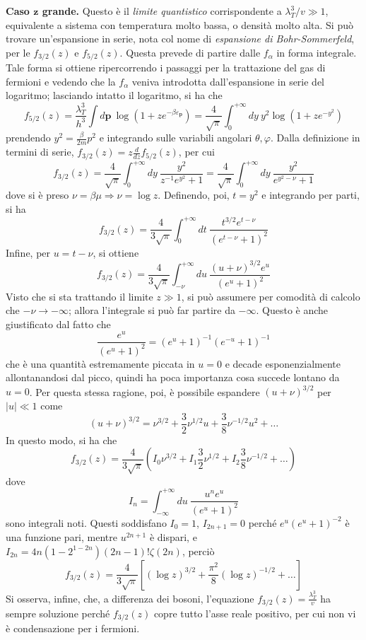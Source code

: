 \documentclass[11pt, a4paper]{scrartcl}
\theoremstyle{style}
\theoremstyle{style1}
\numberwithin{equation}{subsection}
\begin{document}
\textbf{Caso $\mathbf{z} $ grande.} Questo \`e il \textit{limite quantistico} corrispondente a $\lambda _T^3 / v \gg 1$, equivalente a sistema con temperatura molto bassa, o densit\`a molto alta.
Si pu\`o trovare un'espansione in serie, nota col nome di \textit{espansione di Bohr-Sommerfeld}, per le $f_{3 / 2}(z)$ e $f_{5 / 2} (z)$.
Questa prevede di partire dalle $f_\alpha $ in forma integrale. 
Tale forma si ottiene ripercorrendo i passaggi per la trattazione del gas di fermioni e vedendo che la $f_\alpha $ veniva introdotta dall'espansione in serie del logaritmo; lasciando intatto il logaritmo, si ha che
\[
f_{5 / 2} (z) = \frac{\lambda _T ^3}{h^3} \int d \mathbf{p} \ \log\left(1+z e^{-\beta \varepsilon _\mathbf{p} }\right) = \frac{4}{\sqrt{\pi} } \int _0^{+\infty} dy \ y ^2 \log\left(1+ z e^{-y^2}\right) 
\] 
prendendo $y^2 = \frac{\beta }{2m}p^2$ e integrando sulle variabili angolari $\theta ,\varphi $.
Dalla definizione in termini di serie, $f_{3 / 2} (z) = z \frac{d }{d z} f_{5 / 2} (z)$, per cui 
\[
f_{3 / 2} (z) = \frac{4}{\sqrt{\pi} } \int _0^{+\infty} dy\ \frac{y^2 }{z^{-1}e^{y^2}+1}=\frac{4}{\sqrt{\pi} } \int _0^{+\infty}dy \  \frac{y^2}{e^{y^2 - \nu }+1}
\] 
dove si \`e preso $\nu = \beta \mu \Rightarrow \nu =\log z$.
Definendo, poi, $t = y^2$ e integrando per parti, si ha
\[
f_{3 / 2} (z) = \frac{4}{3\sqrt{\pi} }\int _{0} ^{+\infty} dt \ \frac{t^{3 / 2} e^{t - \nu }}{\left(e^{t-\nu } + 1\right) ^2}
\] 
Infine, per $u = t - \nu $, si ottiene
\[
f_{3 / 2} (z) = \frac{4}{3\sqrt{\pi} }\int _{-\nu } ^{+\infty}  du \ \frac{(u+\nu )^{3 / 2}e^{u}}{\left(e^{u}+1\right) ^2}
\] 
Visto che si sta trattando il limite $z\gg 1$, si pu\`o assumere per comodit\`a di calcolo che $-\nu \to -\infty$; allora l'integrale si pu\`o far partire da $-\infty$.
Questo \`e anche giustificato dal fatto che
\[
\frac{e^{u }}{(e^u +1)^2 }= (e^u + 1)^{-1} (e^{-u} + 1)^{-1}
\] 
che \`e una quantit\`a estremamente piccata in $u=0$ e decade esponenzialmente allontanandosi dal picco, quindi ha poca importanza cosa succede lontano da $u=0$.
Per questa stessa ragione, poi, \`e possibile espandere $(u+\nu )^{3 / 2}$ per $\lvert u \rvert  \ll 1$ come
\[
	(u+\nu )^{ 3 / 2} = \nu ^{3 / 2} + \frac{3}{2} \nu ^{1 / 2} u + \frac{3}{8} \nu ^{-1 / 2} u^2 + \ldots
\] 
In questo modo, si ha che
\[
f_{3 / 2} (z) = \frac{4}{3\sqrt{\pi} } \left(I_0\nu ^{3 / 2} + I_1 \frac{3}{2}\nu ^{1 / 2} + I_2 \frac{3}{8}\nu ^{- 1 / 2}+\ldots\right) 
\] 
dove 
\[
I_n = \int _{-\infty}^{+\infty} du \ \frac{u^n e^u}{(e^u+1)^2}
\] 
sono integrali noti.
Questi soddisfano $I_0=1$, $I_{2n+1} =0  $ perch\'e $e^u (e^u+1)^{-2}$ \`e una funzione pari, mentre $u^{2n+1}$ \`e dispari, e $I_{2n} = 4n (1-2^{1-2n})(2n-1)!\zeta(2n)$, perci\`o
\[
f_{3 / 2} (z) = \frac{4}{3\sqrt{\pi} }\left[ (\log z)^{3 / 2}+\frac{\pi^2}{8}(\log z ) ^{- 1 /2} +\ldots \right] 
\] 
Si osserva, infine, che, a differenza dei bosoni, l'equazione $f_{3 / 2} (z) = \frac{\lambda _T^3}{v}$ ha sempre soluzione perch\'e $f_{3/2} (z)$ copre tutto l'asse reale positivo, per cui non vi \`e condensazione per i fermioni.
\vspace{.5cm}
\end{document}
